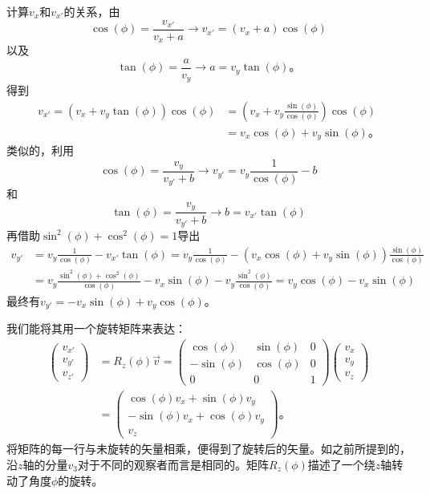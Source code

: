 计算$v_x$和$v_{x'}$的关系，由
\[
\cos(\phi)=\frac{v_{x'}}{v_x+a} \rightarrow v_{x'}=(v_x+a)\cos(\phi)
\]
以及
\[
\tan(\phi)=\frac{a}{v_y}\rightarrow a=v_y\tan(\phi)\text{。}
\]
得到
\[
\begin{aligned}
v_{x'}=(v_x+v_y\tan(\phi))\cos(\phi)&=\left(v_x+v_y\frac{\sin(\phi)}{\cos(\phi)}\right)\cos(\phi) \\
 & = v_x\cos(\phi)+v_y\sin(\phi)\text{。}
\end{aligned}
\]
类似的，利用
\[
\cos(\phi) = \frac{v_y}{v_{y'}+b}\rightarrow v_{y'}=v_y\frac{1}{\cos(\phi)}-b
\]
和
\[
\tan(\phi)=\frac{v_y}{v_{y'}+b}\rightarrow b=v_{x'}\tan(\phi)
\]
再借助$\sin^2(\phi)+\cos^2(\phi)=1$导出
\[\begin{split}
v_{y'}&=v_y\frac{1}{\cos(\phi)}-v_{x'}\tan(\phi)=v_y\frac{1}{\cos(\phi)}-(v_x\cos(\phi)+v_y\sin(\phi))\frac{\sin(\phi)}{\cos(\phi)}  \\
&= v_y\frac{\sin^2(\phi)+\cos^2(\phi)}{\cos(\phi)}-v_x\sin(\phi)-v_y\frac{\sin^2(\phi)}{\cos(\phi)} = v_y\cos(\phi)-v_x\sin(\phi)
\end{split}\]
最终有$v_{y'}=-v_x\sin(\phi)+v_y\cos(\phi)$。

我们能将其用一个旋转矩阵来表达：
\begin{equation}
\begin{aligned}
\begin{pmatrix}
v_{x'} \\ v_{y'} \\ v_{z'}
\end{pmatrix} &= R_z(\phi)\vec{v} =
\begin{pmatrix}
\cos(\phi) & \sin(\phi) & 0 \\
-\sin(\phi) & \cos(\phi) & 0 \\
0 & 0 & 1
\end{pmatrix}
\begin{pmatrix}
v_x \\ v_y \\ v_z
\end{pmatrix} \\
&= \begin{pmatrix}
\cos(\phi)v_x+\sin(\phi)v_y \\ -\sin(\phi)v_x+\cos(\phi)v_y \\ v_z
\end{pmatrix}\text{。}
\end{aligned}
\end{equation}
将矩阵的每一行与未旋转的矢量相乘，便得到了旋转后的矢量。如之前所提到的，沿$z$轴的分量$v_3$对于不同的观察者而言是相同的。矩阵$R_z(\phi)$描述了一个绕$z$轴转动了角度$\phi$的旋转。

